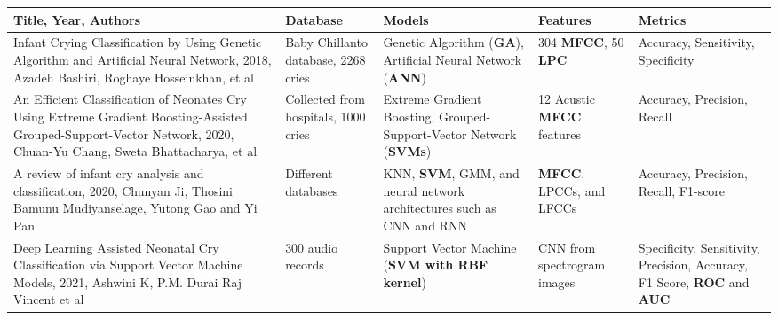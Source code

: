 \begin{table}[!ht]
    \small
    \setlength\extrarowheight{2pt} %
    \begin{tabularx}{\textwidth}{Xp{1.8cm}p{3.3cm}p{1.5cm}p{2.2cm}}
    \toprule
        \rowcolor{orange!10}
        \textbf{Title, Year, Authors} & \textbf{Database}  & \textbf{Models}  & \textbf{Features} & \textbf{Metrics}  \\
    \midrule  
        Infant Crying Classification by Using Genetic Algorithm and Artificial Neural Network, 2018, Azadeh Bashiri, Roghaye Hosseinkhan, et al \cite{Bashiri2020} & Baby Chillanto database, 2268 cries & Genetic Algorithm (\textbf{GA}), Artificial Neural Network (\textbf{ANN}) & 304 \textbf{MFCC}, 50 \textbf{LPC} & Accuracy, Sensitivity, Specificity \\ %

        An Efficient Classification of Neonates Cry Using Extreme Gradient Boosting-Assisted Grouped-Support-Vector Network, 2020, Chuan-Yu Chang, Sweta Bhattacharya, et al \cite{Chang2020} & Collected from hospitals, 1000 cries & Extreme Gradient Boosting, Grouped-Support-Vector Network (\textbf{SVMs}) & 12 Acustic \textbf{MFCC} features & Accuracy, Precision, Recall \\ %

        A review of infant cry analysis and classification, 2020, Chunyan Ji, Thosini Bamunu Mudiyanselage, Yutong Gao and Yi Pan \cite{ Ji2020} & Different databases & KNN, \textbf{SVM}, GMM, and neural network architectures such as CNN and RNN & \textbf{MFCC}, LPCCs, and LFCCs & Accuracy, Precision, Recall, F1-score \\ %

        Deep Learning Assisted Neonatal Cry Classification via Support Vector Machine Models, 2021, Ashwini K, P.M. Durai Raj Vincent et al \cite{K2021} & 300 audio records & Support Vector Machine (\textbf{SVM with RBF kernel}) & CNN from spectrogram images & Specificity, Sensitivity, Precision, Accuracy, F1 Score, \textbf{ROC} and \textbf{AUC} \\ %
        

\end{tabularx}
\end{table}

